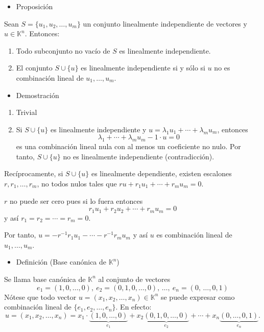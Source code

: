 \begin{itemize}[label=\color{red}\textbullet, leftmargin=*]
	\item \color{lightblue}Proposición
\end{itemize}
Sean $S=\{u_1,u_2,\dots,u_m\}$ un conjunto linealmente independiente de vectores y $u\in\mathbb{K}^n$. Entonces:
\begin{enumerate}[label=\arabic*)]
	\item Todo subconjunto no vacío de $S$ es linealmente independiente.
	\item El conjunto $S\cup\{u\}$ es linealmente independiente si y sólo si $u$ no es combinación lineal de $u_1,\dots,u_m$.
\end{enumerate}
\begin{itemize}[label=\color{red}\textbullet, leftmargin=*]
	\item \color{lightblue}Demostración
\end{itemize}
\begin{enumerate}[label=\arabic*)]
	\item Trivial
	\item Si  $S\cup\{u\}$ es linealmente independiente y $u=\lambda_1u_1+\cdots+\lambda_mu_m$, entonces \[ \lambda_1+\cdots+\lambda_mu_m-1\cdot u=0 \] es una combinación lineal nula con al menos un coeficiente no nulo. Por tanto, $S\cup\{u\}$ no es linealmente independiente (contradicción).
\end{enumerate}
Recíprocamente, si $S\cup\{u\}$ es linealmente dependiente, existen escalones $r,r_1,\dots,r_m$, no todos nulos tales que $ru+r_1u_1+\cdots+r_mu_m=0$. 

$r$ no puede ser cero pues si lo fuera entonces \[ r_1u_1+r_2u_2+\cdots+r_mu_m=0 \] y así $r_1=r_2=\cdots=r_m=0$.

Por tanto, $u=-r^{-1}r_1u_1-\cdots-r^{-1}r_mu_m$ y así $u$ es combinación lineal de $u_1,\dots,u_m$.
\begin{itemize}[label=\color{red}\textbullet, leftmargin=*]
	\item \color{lightblue}Definición (Base canónica de $\mathbb{K}^n$)
\end{itemize}
Se llama base canónica de $\mathbb{K}^n$ al conjunto de vectores \[ e_1=(1,0,\dots,0),\:e_2=(0,1,0,\dots,0),\,\dots,\:e_n=(0,\,\dots,0,1) \] Nótese que todo vector $u=(x_1,x_2,\dots,x_n)\in\mathbb{K}^n$ se puede expresar como combinación lineal de $\{e_1,e_2,\dots,e_n\}$. En efecto: \[ u=(x_1,x_2,\dots,x_n)=x_1\cdot\underbrace{(1,0,\dots,0)}_{e_1}+x_2\underbrace{(0,1,0,\dots,0)}_{e_2}+\cdots+x_n\underbrace{(0,\dots,0,1)}_{e_n}. \]

